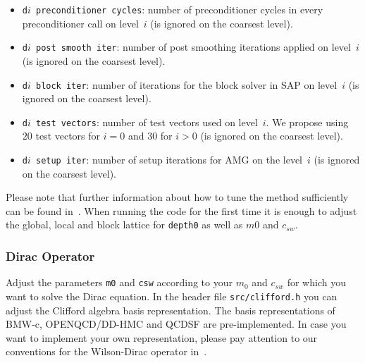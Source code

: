 \documentclass[a4paper,12pt]{scrartcl}
\begin{document}
\begin{itemize}
\begin{itemize}
    \item \texttt{d$i$ preconditioner cycles}: number of preconditioner cycles in every preconditioner call on level~$i$ (is ignored on the coarsest level).
    \item \texttt{d$i$ post smooth iter}: number of post smoothing iterations applied on level~$i$ (is ignored on the coarsest level).
    \item \texttt{d$i$ block iter}: number of iterations for the block solver in SAP on level~$i$ (is ignored on the coarsest level).
    \item \texttt{d$i$ test vectors}: number of test vectors used on level~$i$. We propose using $20$ test vectors for $i=0$ and $30$ for $i>0$ (is ignored on the coarsest level).
    \item \texttt{d$i$ setup iter}: number of setup iterations for AMG on the level~$i$ (is ignored on the coarsest level).
  \end{itemize}
\end{itemize}
Please note that further information about how to tune the method sufficiently can be found in~\cite{Frommer:2013kla,FroKaKrLeRo13,RottmannPhD}. When running the code for the first time it is enough to adjust the global, local and block lattice for \texttt{depth0} as well as $m0$ and $c_{sw}$.

\subsubsection{Dirac Operator}
Adjust the parameters \texttt{m0} and \texttt{csw} according to your $m_0$ and $c_{sw}$ for which you want to solve the Dirac equation. In the header file \texttt{src/clifford.h} you can adjust the Clifford algebra basis representation. The basis representations of BMW-c, OPENQCD/DD-HMC and QCDSF are pre-implemented. In case you want to implement your own representation, please pay attention to our conventions for the Wilson-Dirac operator in~\cite{FroKaKrLeRo13,RottmannPhD}.
\end{document}
